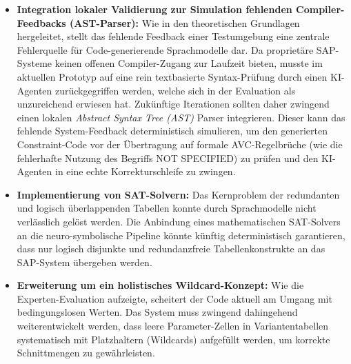\begin{itemize}
\item \textbf{Integration lokaler Validierung zur Simulation fehlenden Compiler-Feedbacks (\ac{AST}-Parser):} Wie in den theoretischen Grundlagen hergeleitet, stellt das fehlende Feedback einer Testumgebung eine zentrale Fehlerquelle für Code-generierende Sprachmodelle dar. Da proprietäre SAP-Systeme keinen offenen Compiler-Zugang zur Laufzeit bieten, musste im aktuellen Prototyp auf eine rein textbasierte Syntax-Prüfung durch einen \ac{KI}-Agenten zurückgegriffen werden, welche sich in der Evaluation als unzureichend erwiesen hat. Zukünftige Iterationen sollten daher zwingend einen lokalen \textit{Abstract Syntax Tree (\ac{AST})} Parser integrieren. Dieser kann das fehlende System-Feedback deterministisch simulieren, um den generierten Constraint-Code vor der Übertragung auf formale \ac{AVC}-Regelbrüche (wie die fehlerhafte Nutzung des Begriffs \glqq NOT SPECIFIED\grqq{}) zu prüfen und den \ac{KI}-Agenten in eine echte Korrekturschleife zu zwingen.
\item \textbf{Implementierung von \ac{SAT}-Solvern:} Das Kernproblem der redundanten und logisch überlappenden Tabellen konnte durch Sprachmodelle nicht verlässlich gelöst werden. Die Anbindung eines mathematischen \ac{SAT}-Solvers an die neuro-symbolische Pipeline könnte künftig deterministisch garantieren, dass nur logisch disjunkte und redundanzfreie Tabellenkonstrukte an das SAP-System übergeben werden.
\item \textbf{Erweiterung um ein holistisches Wildcard-Konzept:} Wie die Experten-Evaluation aufzeigte, scheitert der Code aktuell am Umgang mit bedingungslosen Werten. Das System muss zwingend dahingehend weiterentwickelt werden, dass leere Parameter-Zellen in Variantentabellen systematisch mit Platzhaltern (Wildcards) aufgefüllt werden, um korrekte Schnittmengen zu gewährleisten.
\end{itemize}

